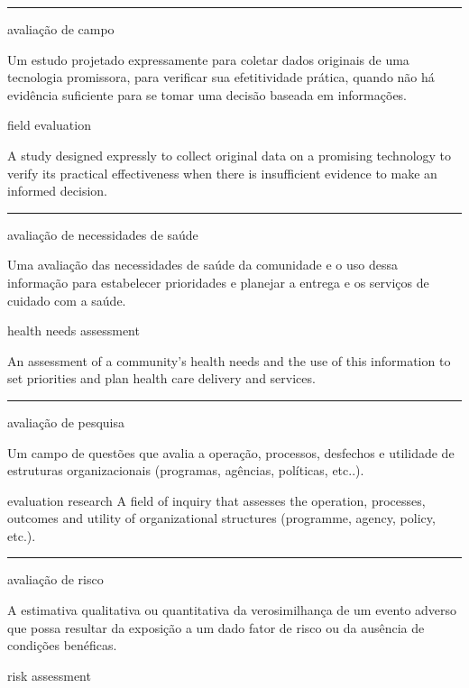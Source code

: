 \documentclass[
]{book}
\begin{document}
\begin{center}\rule{0.5\linewidth}{0.5pt}\end{center}

avaliação de campo

Um estudo projetado expressamente para coletar dados originais de uma tecnologia promissora, para verificar sua efetitividade prática, quando não há evidência suficiente para se tomar uma decisão baseada em informações.

field evaluation

A study designed expressly to collect original data on a promising technology to verify its practical effectiveness when there is insufficient evidence to make an informed decision.

\begin{center}\rule{0.5\linewidth}{0.5pt}\end{center}

avaliação de necessidades de saúde

Uma avaliação das necessidades de saúde da comunidade e o uso dessa informação para estabelecer prioridades e planejar a entrega e os serviços de cuidado com a saúde.

health needs assessment

An assessment of a community's health needs and the use of this information to set priorities and plan health care delivery and services.

\begin{center}\rule{0.5\linewidth}{0.5pt}\end{center}

avaliação de pesquisa

Um campo de questões que avalia a operação, processos, desfechos e utilidade de estruturas organizacionais (programas, agências, políticas, etc..).

evaluation research
A field of inquiry that assesses the operation, processes, outcomes and utility of organizational structures (programme, agency, policy, etc.).

\begin{center}\rule{0.5\linewidth}{0.5pt}\end{center}

avaliação de risco

A estimativa qualitativa ou quantitativa da verosimilhança de um evento adverso que possa resultar da exposição a um dado fator de risco ou da ausência de condições benéficas.

risk assessment
\end{document}
